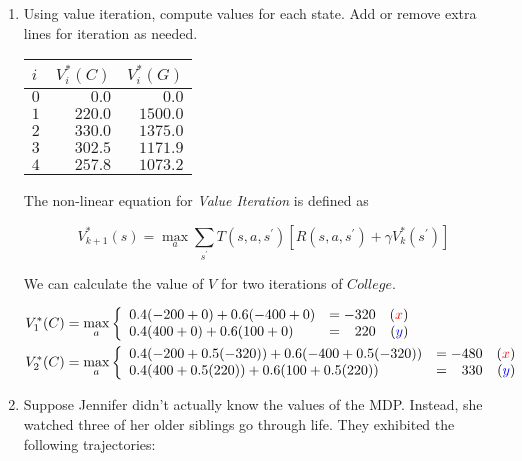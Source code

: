 \documentclass[12pt]{article}
\begin{document}
\begin{enumerate}

\item Using value iteration, compute values for each state.  Add or
  remove extra lines for iteration as needed.

\begin{center}
\begin{tabular}{|l|r|r|} \hline
$i$ & $V_i^*(C)$ & $V_i^*(G)$ \\ \hline
$0$ &$0.0$ &$0.0$ \\ \hline
$1$ & $220.0$ & $1500.0$\\ \hline
$2$ & $330.0$ & $1375.0$\\ \hline
$3$ & $302.5$ & $1171.9$\\ \hline
$4$ & $257.8$ & $1073.2$\\ \hline
\end{tabular}
\end{center}

The non-linear equation for {\em Value Iteration} is defined as

\[
  V^{*}_{k+1}(s) = \max_{a}\sum_{s^{\prime}}T(s, a, s^{\prime})\left[ R(s, a, s^{\prime}) + \gamma V^{*}_{k}(s^{\prime})\right]
\]

We can calculate the value of $V$ for two iterations of $College$.

\begin{align*}
V_{1}^{*}(C) &= \max_{a}\left\{ \begin{array}{lcr@{}}
                                  0.4(-200 + 0) + 0.6(-400 + 0) & = -320 & ({\color{red}{x}})\\
                                  0.4(400 + 0) + 0.6(100 + 0) & = \phantom{-}220 & ({\color{blue}{y}})\\
                                \end{array}\right.\\
V_{2}^{*}(C) &= \max_{a}\left\{ \begin{array}{lcr@{}}
                                  0.4(-200 + 0.5(-320)) + 0.6(-400 + 0.5(-320)) & = -480& ({\color{red}{x}})\\
                                  0.4(400 + 0.5(220)) + 0.6(100 + 0.5(220)) & = \phantom{-}330 & ({\color{blue}{y}})\\
                                \end{array}\right.
\end{align*}

\item Suppose Jennifer didn't actually know the values of the MDP.
  Instead, she watched three of her older siblings go through life.
  They exhibited the following trajectories:


\end{enumerate}
\end{document}
